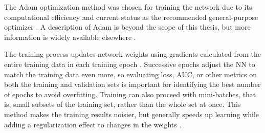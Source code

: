 The Adam optimization method was chosen for training the network due to its computational efficiency and current status as the recommended general-purpose optimizer \citep{brownlee_gentle_2017}. A description of Adam is beyond the scope of this thesis, but more information is widely available elsewhere \citep[e.g.,\ ][]{kingma_adam_2017}.

The training process updates network weights using gradients calculated from the entire training data in each training epoch \citep[p.\ 397]{hastie_elements_2009}. Successive epochs adjust the NN to match the training data even more, so evaluating loss, AUC, or other metrics on both the training and validation sets is important for identifying the best number of epochs to avoid overfitting. Training can also proceed with mini-batches, that is, small subsets of the training set, rather than the whole set at once. This method makes the training results noisier, but generally speeds up learning while adding a regularization effect to changes in the weights \citep{brownlee_how_2019}.  

